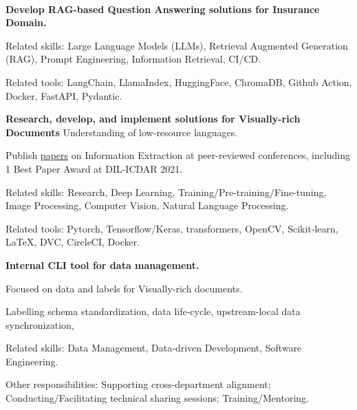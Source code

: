 \\
\vspace{-.2em}
\begin{xitemize}
    \item \textbf{Develop RAG-based Question Answering solutions for Insurance Domain.}
    \begin{zitemize}
        \item Related skills: Large Language Models (LLMs), Retrieval Augmented
        Generation (RAG), Prompt Engineering, Information Retrieval, CI/CD.
        \item Related tools: LangChain, LlamaIndex, HuggingFace, ChromaDB, Github
        Action, Docker, FastAPI, Pydantic.
    \end{zitemize}
    \item \textbf{Research, develop, and implement solutions for Visually-rich Documents}
    Understanding of low-resource languages.
    \begin{zitemize}
        \item Publish \href{https://scholar.google.com/citations?user=\gscholarid}{papers} on
        Information Extraction at peer-reviewed conferences, including 1 Best Paper Award
        at DIL-ICDAR 2021.
        \item Related skills: Research, Deep Learning, Training/Pre-training/Fine-tuning, Image Processing, Computer Vision, Natural Language Processing.
        \item Related tools: Pytorch, Tensorflow/Keras, transformers, OpenCV, Scikit-learn, \LaTeX, DVC, CircleCI, Docker.
    \end{zitemize}
    \item \textbf{Internal CLI tool for data management.}
    \begin{zitemize}
        \item Focused on data and labels for Visually-rich documents.
        \item Labelling schema standardization, data life-cycle, upstream-local data
        synchronization,
        \item Related skills: Data Management, Data-driven Development, Software Engineering.
    \end{zitemize}
    \item Other responsibilities: Supporting cross-department alignment; Conducting/Facilitating technical sharing sessions; Training/Mentoring.
\end{xitemize}


